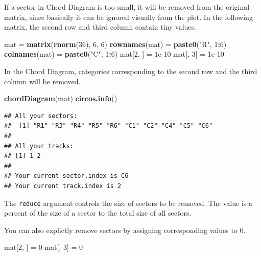\documentclass[]{book}
\newenvironment{Shaded}{\begin{snugshade}}{\end{snugshade}}
\newcommand{\KeywordTok}[1]{\textcolor[rgb]{0.13,0.29,0.53}{\textbf{#1}}}
\newcommand{\DecValTok}[1]{\textcolor[rgb]{0.00,0.00,0.81}{#1}}
\newcommand{\FloatTok}[1]{\textcolor[rgb]{0.00,0.00,0.81}{#1}}
\newcommand{\StringTok}[1]{\textcolor[rgb]{0.31,0.60,0.02}{#1}}
\newcommand{\OperatorTok}[1]{\textcolor[rgb]{0.81,0.36,0.00}{\textbf{#1}}}
\newcommand{\NormalTok}[1]{#1}
\theoremstyle{definition}
\theoremstyle{definition}
\theoremstyle{remark}
\begin{document}
If a sector in Chord Diagram is too small, it will be removed from the
original matrix, since basically it can be ignored visually from the
plot. In the following matrix, the second row and third column contain
tiny values.

\begin{Shaded}
\begin{Highlighting}[]
\NormalTok{mat =}\StringTok{ }\KeywordTok{matrix}\NormalTok{(}\KeywordTok{rnorm}\NormalTok{(}\DecValTok{36}\NormalTok{), }\DecValTok{6}\NormalTok{, }\DecValTok{6}\NormalTok{)}
\KeywordTok{rownames}\NormalTok{(mat) =}\StringTok{ }\KeywordTok{paste0}\NormalTok{(}\StringTok{"R"}\NormalTok{, }\DecValTok{1}\OperatorTok{:}\DecValTok{6}\NormalTok{)}
\KeywordTok{colnames}\NormalTok{(mat) =}\StringTok{ }\KeywordTok{paste0}\NormalTok{(}\StringTok{"C"}\NormalTok{, }\DecValTok{1}\OperatorTok{:}\DecValTok{6}\NormalTok{)}
\NormalTok{mat[}\DecValTok{2}\NormalTok{, ] =}\StringTok{ }\FloatTok{1e-10}
\NormalTok{mat[, }\DecValTok{3}\NormalTok{] =}\StringTok{ }\FloatTok{1e-10}
\end{Highlighting}
\end{Shaded}

In the Chord Diagram, categories corresponding to the second row and the
third column will be removed.

\begin{Shaded}
\begin{Highlighting}[]
\KeywordTok{chordDiagram}\NormalTok{(mat)}
\KeywordTok{circos.info}\NormalTok{()}
\end{Highlighting}
\end{Shaded}

\begin{verbatim}
## All your sectors:
##  [1] "R1" "R3" "R4" "R5" "R6" "C1" "C2" "C4" "C5" "C6"
## 
## All your tracks:
## [1] 1 2
## 
## Your current sector.index is C6
## Your current track.index is 2
\end{verbatim}

The \texttt{reduce} argument controls the size of sectors to be removed.
The value is a percent of the size of a sector to the total size of all
sectors.

You can also explictly remove sectors by assigning corresponding values
to 0.

\begin{Shaded}
\begin{Highlighting}[]
\NormalTok{mat[}\DecValTok{2}\NormalTok{, ] =}\StringTok{ }\DecValTok{0}
\NormalTok{mat[, }\DecValTok{3}\NormalTok{] =}\StringTok{ }\DecValTok{0}
\end{Highlighting}
\end{Shaded}
\end{document}
